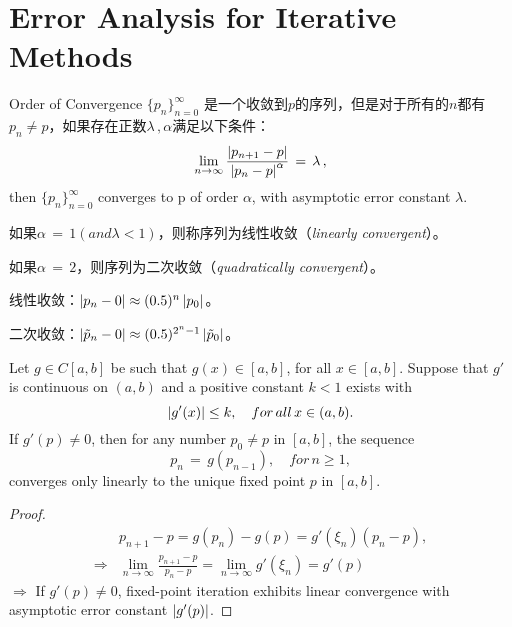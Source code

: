 \section{Error Analysis for Iterative Methods}

\begin{defn}{Order of Convergence}
$\{p_n\}_{n=0}^\infty$ 是一个收敛到$p$的序列，但是对于所有的$n$都有$p_n\neq p$，如果存在正数$\lambda\,,\alpha$满足以下条件：
\[
\lim_{n\rightarrow\infty}\frac{\left|p_{n+1}-p\right|}{\left|p_n-p\right|^\alpha}\,=\,\lambda\,,
\]
then $\{p_n\}_{n=0}^\infty$ converges to p of order $\alpha$, with asymptotic error constant $\lambda$.
\end{defn}

如果$\alpha\,=\,1(and \lambda <1)$，则称序列为线性收敛（\emph{linearly convergent}）。\par
如果$\alpha\,=\,2$，则序列为二次收敛（\emph{quadratically convergent}）。

线性收敛：$\left|p_n-0\right|\approx(0.5)^n\left|p_0\right|$。\par
二次收敛：$\left|\tilde{p}_n-0\right|\approx(0.5)^{2^n-1}\left|\tilde{p}_0\right|$。\par
\begin{theo}
Let $g\in C[a,b]$ be such that $g(x)\in [a,b]$, for all $x\in [a,b]$. Suppose that $g'$ is continuous on $(a,b)$ and a positive constant $k<1$ exists with
\[
\left|g'(x)\right|\leq k,\quad for\,all\,x\in (a,b).
\]
If $g'(p)\neq 0$, then for any number $p_0\neq p$ in $[a,b]$, the sequence
\[
p_n\,=\,g(p_{n-1}),\quad for\,n\geq 1,
\]
converges only linearly to the unique fixed point $p$ in $[a,b]$.
\end{theo}
\begin{proof}
\begin{align*}
    & p_{n+1}-p=g(p_n)-g(p)=g'(\xi_n)(p_n-p), \\
    \Rightarrow & \lim_{n\rightarrow\infty}\frac{p_{n+1}-p}{p_n-p}=\lim_{n\rightarrow\infty}g'(\xi_n)=g'(p)
\end{align*}
$\Rightarrow$ If $g'(p)\neq 0$, fixed-point iteration exhibits linear convergence with \\asymptotic error constant $\left|g'(p)\right|$.
\end{proof}

